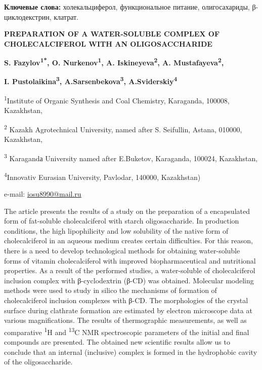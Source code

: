 {\bfseries Ключевые слова:} холекальциферол, функциональное питание,
олигосахариды, β-циклодекстрин, клатрат.

\begin{center}
{\large\bfseries PREPARATION OF A WATER-SOLUBLE COMPLEX OF CHOLECALCIFEROL WITH
AN OLIGOSACCHARIDE}

{\bfseries S. Fazylov\textsuperscript{1*}, O. Nurkenov\textsuperscript{1},
A. Iskineyeva\textsuperscript{2}, A. Mustafayeva\textsuperscript{2},}

{\bfseries I. Pustolaikina\textsuperscript{3},
A.Sarsenbekova\textsuperscript{3}, A.Sviderskiy\textsuperscript{4}}

\textsuperscript{1}Institute of Organic Synthesis and Coal Chemistry,
Karaganda, 100008, Kazakhstan,

\textsuperscript{2} Kazakh Agrotechnical University, named after S.
Seifullin, Astana, 010000, Kazakhstan,

\textsuperscript{3} Karagandа University named after E.Buketov,
Karaganda, 100024, Kazakhstan,

\textsuperscript{4}Innovativ Eurasian University, Pavlodar, 140000,
Kazakhstan)

e-mail: \href{mailto:iosu8990@mail.ru}{\ul{iosu8990@mail.ru}}
\end{center}

The article presents the results of a study on the preparation of a
encapsulated form of fat-soluble cholecalciferol with starch
oligosaccharide. In production conditions, the high lipophilicity and
low solubility of the native form of cholecalciferol in an aqueous
medium creates certain difficulties. For this reason, there is a need to
develop technological methods for obtaining water-soluble forms of
vitamin cholecalciferol with improved biopharmaceutical and nutritional
properties. As a result of the performed studies, a water-soluble of
cholecalciferol inclusion complex with β-cyclodextrin (β-CD) was
obtained. Molecular modeling methods were used to study in silico the
mechanisms of formation of cholecalciferol inclusion complexes with
β-CD. The morphologies of the crystal surface during clathrate formation
are estimated by electron microscope data at various magnifications. The
results of thermographic measurements, as well as comparative
\textsuperscript{1}H and \textsuperscript{13}C NMR spectroscopic
parameters of the initial and final compounds are presented. The
obtained new scientific results allow us to conclude that an internal
(inclusive) complex is formed in the hydrophobic cavity of the
oligosaccharide.

